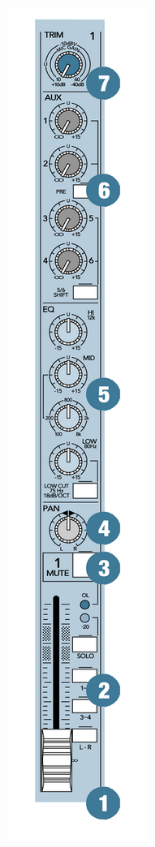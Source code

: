 \begin{multicols}{2}
\begin{center}
  \includegraphics[height=220mm]{Images/Mackie.png}
\end{center}

\end{multicols}

\newpage

